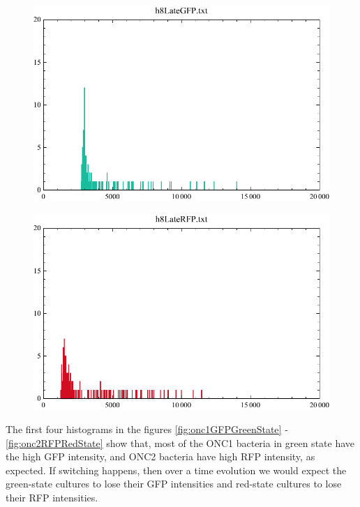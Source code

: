 \documentclass[11pt]{book}
\begin{document}
\begin{figure}[h]
\centering
	\begin{minipage}{.5\textwidth}
  		\centering
  		\includegraphics[width=.9\linewidth]{h8LateGFP.pdf}
  		\label{fig:onc2GFPAfterHours}
	\end{minipage}%
	\begin{minipage}{.5\textwidth}
  		\centering
  		\includegraphics[width=.9\linewidth]{h8LateRFP.pdf}
  		\label{fig:onc2RFPAfterHours}  
	\end{minipage}
\end{figure}

The first four histograms in the figures \ref{fig:onc1GFPGreenState} - \ref{fig:onc2RFPRedState} show that, most of the  ONC1 bacteria in green state have the high GFP intensity, and ONC2 bacteria have high RFP intensity, as expected. If switching happens, then over a time evolution we would expect the green-state cultures to lose their GFP intensities and red-state cultures to lose their RFP intensities.
\end{document}
